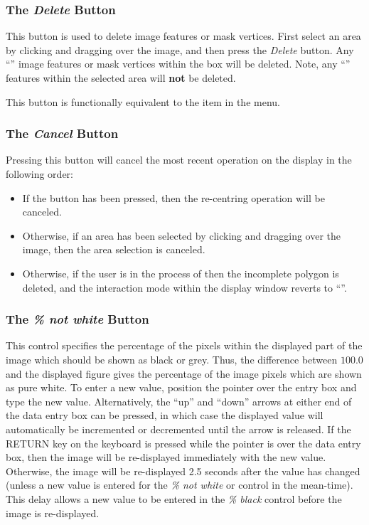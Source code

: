 \subsubsection {The {\em Delete} Button}
This button is used to delete image features or mask vertices. First
select an area by clicking and dragging over the image, and then press
the {\em Delete} button. Any ``''
image features or mask vertices within the box will be deleted.
Note, any ``'' features within
the selected area will {\bf not} be deleted.

This button is functionally equivalent to the  item in the  menu.

\subsubsection {The {\em Cancel} Button}
Pressing this button will cancel the most recent operation on the display
in the following order:

\begin{itemize}
\item If the  button has been
pressed, then the re-centring operation will be canceled.

\item Otherwise, if an area has been selected by clicking and dragging
over the image, then the area selection is canceled.

\item Otherwise, if the user is in the process of 
 then the incomplete
polygon is deleted, and the interaction mode within the display window
reverts to ``''.
\end{itemize}

\subsubsection {The {\em \% not white} Button}
This control specifies the percentage of the pixels within the displayed
part of the image which should be shown as black or grey. Thus, the
difference between $100.0$ and the displayed figure gives the percentage
of the image pixels which are shown as pure white. To enter a new value,
position the pointer over the entry box and type the new value.
Alternatively, the ``up'' and ``down'' arrows at either end of the data
entry box can be pressed, in which case the displayed value will
automatically be incremented or decremented until the arrow is released.
If the RETURN key on the keyboard is pressed while the pointer is
over the data entry box, then the image will be re-displayed immediately
with the new value. Otherwise, the image will be re-displayed 2.5 seconds
after the value has changed (unless a new value is entered for the {\em
\% not white} or  control in
the mean-time). This delay allows a new value to be entered in the {\em
\% black} control before the image is re-displayed.

